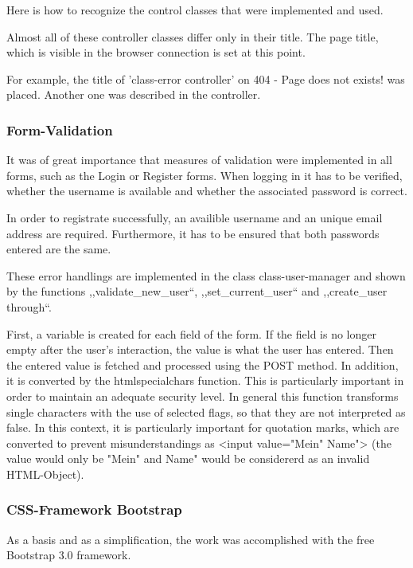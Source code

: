 \documentclass[a4paper,12pt,oneside]{article} %
\begin{document}
Here is how to recognize the control classes that were implemented and used.

Almost all of these controller classes differ only in their title.
The page title, which is visible in the browser connection is \textquotedbl{}set\textquotedbl{}
at this point.

For example, the title of 'class-error controller' on \textquotedbl{}404
- Page does not exists!\textquotedbl{} was placed. Another one was described
in the controller.


\subsubsection{Form-Validation}

It was of great importance that measures of validation were implemented in all forms,
such as the Login or Register forms.
When logging in it has to be verified, whether the username is available and whether the
associated password is correct.

In order to registrate successfully, an availible username and an unique email address are required.
Furthermore, it has to be ensured that both passwords entered are the same.

These error handlings are implemented in the class \textquotedbl{}class-user-manager\textquotedbl{}
and shown by the functions ,,validate\_new\_user``, ,,set\_current\_user``
and ,,create\_user through``.

First, a variable is created for each field of the form. If the field is no longer empty after the user's interaction, the value is what the user has entered. Then the entered value is fetched and processed using the POST method. In addition, it is converted by the htmlspecialchars function. This is particularly important in order to maintain an adequate security level. In general this function transforms single characters with the use of selected flags, so that they are not interpreted as false. In this context, it is particularly important for quotation marks, which are converted to prevent misunderstandings as <input value="Mein" Name"> (the value would only be "Mein" and Name" would be considererd as an invalid HTML-Object).


\subsubsection{CSS-Framework Bootstrap}

As a basis and as a simplification, the work was accomplished with the free Bootstrap 3.0 framework.
\end{document}

